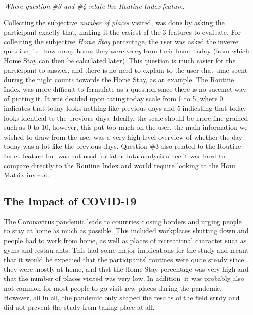 \textit{Where question \#3 and \#4 relate the Routine Index feature.}

Collecting the subjective \textit{number of places} visited, was done by asking the participant exactly that, making it the easiest of the 3 features to evaluate. For collecting the subjective \textit{Home Stay} percentage, the user was asked the inverse question, i.e. how many hours they were \textit{away} from their home today (from which Home Stay can then be calculated later). This question is much easier for the participant to answer, and there is no need to explain to the user that time spent during the night counts towards the Home Stay, as an example. The Routine Index was more difficult to formulate as a question since there is no succinct way of putting it. It was decided upon rating today scale from 0 to 5, where 0 indicates that today looks nothing like previous days and 5 indicating that today looks identical to the previous days. Ideally, the scale should be more fine-grained such as 0 to 10, however, this put too much on the user, the main information we wished to draw from the user was a very high-level overview of whether the day today was a lot like the previous days. Question \#3 also related to the Routine Index feature but was not used for later data analysis since it was hard to compare directly to the Routine Index and would require looking at the Hour Matrix instead.

\subsection{The Impact of COVID-19}
The Coronavirus pandemic leads to countries closing borders and urging people to stay at home as much as possible. This included workplaces shutting down and people had to work from home, as well as places of recreational character such as gyms and restaurants. This had some major implications for the study and meant that it would be expected that the participants' routines were quite steady since they were mostly at home, and that the Home Stay percentage was very high and that the number of places visited was very low. In addition, it was probably also not common for most people to go visit new places during the pandemic. However, all in all, the pandemic only shaped the results of the field study and did not prevent the study from taking place at all.


